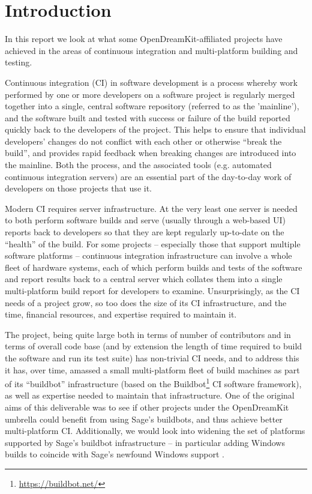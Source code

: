 \documentclass{deliverablereport}
\author{E. M. Bray, Alexander Konovalov, Julian R\"uth}
\begin{document}
\maketitle

\hypertarget{introduction}{%
\section{Introduction}\label{introduction}}

In this report we look at what some OpenDreamKit-affiliated projects have
achieved in the areas of continuous integration and multi-platform building and
testing.

Continuous integration (CI) in software development is a process whereby work
performed by one or more developers on a software project is regularly merged
together into a single, central software repository (referred to as the
'mainline'), and the software built and tested with success or failure of the
build reported quickly back to the developers of the project.  This helps to
ensure that individual developers' changes do not conflict with each other or
otherwise ``break the build'', and provides rapid feedback when breaking changes
are introduced into the mainline.  Both the process, and the associated tools
(e.g. automated continuous integration servers) are an essential part of the
day-to-day work of developers on those projects that use it.

Modern CI requires server infrastructure. At the very least one server is needed
to both perform software builds and serve (usually through a web-based UI) reports
back to developers so that they are kept regularly up-to-date on the
``health'' of the build.  For some projects --  especially those that support
multiple software platforms -- continuous integration infrastructure can involve
a whole fleet of hardware systems, each of which perform builds and tests of
the software and report results back to a central server which collates them
into a single multi-platform build report for developers to examine.
Unsurprisingly, as the CI needs of a project grow, so too does the size of its
CI infrastructure, and the time, financial resources, and expertise required to
maintain it.

The \Sage project, being quite large both in terms of number of contributors
and in terms of overall code base (and by extension the length of time required
to build the software and run its test suite) has non-trivial CI needs, and to
address this it has, over time, amassed a small multi-platform fleet of build
machines as part of its ``buildbot'' infrastructure (based on the
Buildbot\footnote{\url{https://buildbot.net/}} CI software framework), as well
as expertise needed to maintain that infrastructure.  One of the original aims
of this deliverable was to see if other projects under the OpenDreamKit umbrella
could benefit from using Sage's buildbots, and thus achieve better
multi-platform CI.  Additionally, we would look into widening the set of
platforms supported by Sage's buildbot infrastructure -- in particular adding
Windows builds to coincide with Sage's newfound Windows support
.
\end{document}
